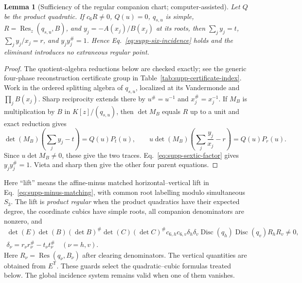 \documentclass[aps,prx,reprint,nofootinbib,twoside,superscriptaddress,longbibliography,floatfix]{revtex4-2}
\newtheorem{lemma}[theorem]{Lemma}
\theoremstyle{definition}
\begin{document}
\begin{lemma}[{Sufficiency of the regular companion chart; computer-assisted}]
\label{lem:supp-companion-sufficiency}
{Let $Q$ be the product quadratic.  If $c_6R\ne0$, $Q(u)=0$, $q_{s,u}$ is simple, $R=\operatorname{Res}_z(q_{s,u},B)$, and $y_j=-A(x_j)/B(x_j)$ at its roots, then $\sum_jy_j=t$, $\sum_jy_j/x_j=r$, and $y_jy_j^\#=1$.  Hence Eq.~\eqref{eq:supp-six-incidence} holds and the eliminant introduces no extraneous regular point.}
\end{lemma}

\begin{proof}
The quotient-algebra reductions below are checked exactly; see the generic four-phase reconstruction certificate group in Table~\ref{tab:supp-certificate-index}.
{Work in the ordered splitting algebra of $q_{s,u}$, localized at its Vandermonde and $\prod_jB(x_j)$.  Sharp reciprocity extends there by $u^\#=u^{-1}$ and $x_j^\#=x_j^{-1}$.  If $M_B$ is multiplication by $B$ in $K[z]/(q_{s,u})$, then $\det M_B$ equals $R$ up to a unit and exact reduction gives}
\begin{equation}
{\det(M_B)\left(\sum_jy_j-t\right)=Q(u)P_t(u),
\qquad
u\det(M_B)\left(\sum_j\frac{y_j}{x_j}-r\right)=Q(u)P_r(u).}
\label{eq:supp-companion-remainders}
\end{equation}
{Since $u\det M_B\ne0$, these give the two traces. Eq.~\eqref{eq:supp-sextic-factor} gives $y_jy_j^\#=1$. Vieta and sharp then give the other four parent equations.}
\end{proof}

{Here ``lift'' means the affine-minus matched horizontal--vertical lift in Eq.~\eqref{eq:supp-minus-matching}, with common root labelling modulo simultaneous $S_3$.} The lift is \emph{product regular} when the product quadratics have their expected degree, the coordinate cubics have simple roots, all companion denominators are nonzero, and
\begin{equation}
{\begin{gathered}
\det(E)\det(B)(\det B)^\#\det(C)(\det C)^\#c_{6,h}c_{6,v}
\delta_h\delta_v
{}\operatorname{Disc}(q_h)\operatorname{Disc}(q_v)R_hR_v\ne0,
\\ \delta_\nu=r_\nu r_\nu^\#-t_\nu t_\nu^\#\quad(\nu=h,v).
\end{gathered}}
\label{eq:supp-product-regularity-guards}
\end{equation}
{Here $R_\nu=\operatorname{Res}(q_\nu,B_\nu)$ after clearing denominators.} The vertical quantities are obtained from $E^{\mathsf T}$. These guards select the quadratic--cubic formulas treated below. The global incidence system remains valid when one of them vanishes.
\end{document}
